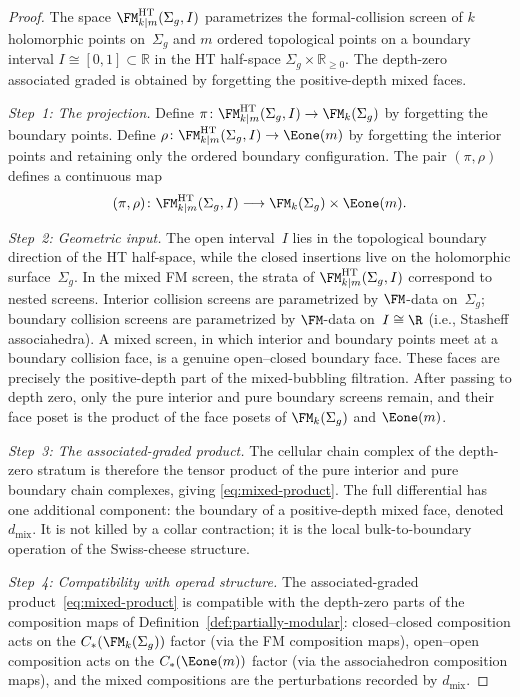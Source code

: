 \begin{proof}
The space $\FM^{\mathrm{HT}}_{k|m}(\Sigma_g,I)$ parametrizes the
formal-collision screen of $k$ holomorphic points on~$\Sigma_g$
and $m$ ordered topological points on a boundary interval
$I \cong [0,1]\subset\mathbb R$ in the HT half-space
$\Sigma_g\times\mathbb R_{\ge0}$.
The depth-zero associated graded is obtained by forgetting the
positive-depth mixed faces.

\medskip\noindent
\emph{Step~1: The projection.}
Define $\pi \colon \FM^{\mathrm{HT}}_{k|m}(\Sigma_g,I)
\to \FM_k(\Sigma_g)$ by forgetting the boundary points.
Define $\rho \colon \FM^{\mathrm{HT}}_{k|m}(\Sigma_g,I)
\to \Eone(m)$ by forgetting the interior points and
retaining only the ordered boundary configuration.
The pair $(\pi, \rho)$ defines a continuous map
\[
 (\pi, \rho) \colon \FM^{\mathrm{HT}}_{k|m}(\Sigma_g,I)
 \longrightarrow \FM_k(\Sigma_g) \times \Eone(m).
\]

\medskip\noindent
\emph{Step~2: Geometric input.}
The open interval~$I$ lies in the topological boundary direction of
the HT half-space, while the closed insertions live on the
holomorphic surface~$\Sigma_g$. In the mixed FM screen, the strata of
$\FM^{\mathrm{HT}}_{k|m}(\Sigma_g,I)$ correspond to
nested screens. Interior collision screens are parametrized by
$\FM$-data on~$\Sigma_g$; boundary collision screens are
parametrized by $\FM$-data on~$I \cong \R$
(i.e., Stasheff associahedra).
A mixed screen, in which interior and boundary points meet at a
boundary collision face, is a genuine open--closed boundary face.
These faces are precisely the positive-depth part of the
mixed-bubbling filtration. After passing to depth zero, only the
pure interior and pure boundary screens remain, and their face
poset is the product of the face posets of $\FM_k(\Sigma_g)$ and
$\Eone(m)$.

\medskip\noindent
\emph{Step~3: The associated-graded product.}
The cellular chain complex of the depth-zero stratum is therefore
the tensor product of the pure interior and pure boundary chain
complexes, giving \eqref{eq:mixed-product}. The full differential
has one additional component: the boundary of a positive-depth
mixed face, denoted $d_{\mathrm{mix}}$. It is
not killed by a collar contraction; it is the local
bulk-to-boundary operation of the Swiss-cheese structure.

\medskip\noindent
\emph{Step~4: Compatibility with operad structure.}
The associated-graded product~\eqref{eq:mixed-product} is
compatible with the depth-zero parts of the composition maps of
Definition~\ref{def:partially-modular}: closed--closed composition acts on the
$C_\ast(\FM_k(\Sigma_g))$ factor (via the FM composition maps),
open--open composition acts on the $C_\ast(\Eone(m))$ factor
(via the associahedron composition maps), and the mixed
compositions are the perturbations recorded by $d_{\mathrm{mix}}$.
\end{proof}

